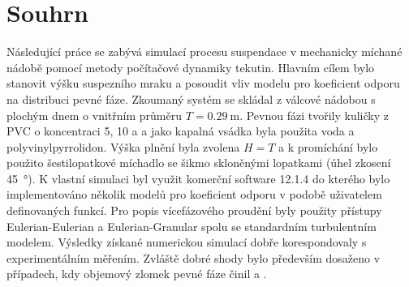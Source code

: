 \section*{Souhrn}
Následující práce se zabývá simulací procesu suspendace v mechanicky míchané nádobě pomocí metody počítačové dynamiky tekutin. Hlavním cílem bylo stanovit výšku suspezního mraku a posoudit vliv modelu pro koeficient odporu na distribuci pevné fáze. Zkoumaný systém se skládal z válcové nádobou s plochým dnem o vnitřním průměru $T=\SI{0.29}{\meter}$. Pevnou fázi tvořily kuličky z PVC o koncentraci 5, 10 a  a jako kapalná vsádka byla použita voda a polyvinylpyrrolidon. Výška plnění byla zvolena $H=T$ a k promíchání bylo použito šestilopatkové míchadlo se šikmo skloněnými lopatkami (úhel zkosení \SI{45}{\degree}). K vlastní simulaci byl využit komerční software \flu{} 12.1.4 do kterého bylo implementováno několik modelů pro koeficient odporu v podobě uživatelem definovaných funkcí. Pro popis vícefázového proudění byly použity přístupy Eulerian-Eulerian a Eulerian-Granular spolu se standardním \keps{} turbulentním modelem. Výsledky získané numerickou simulací dobře korespondovaly s experimentálním měřením. Zvláště dobré shody bylo především dosaženo v případech, kdy objemový zlomek pevné fáze činil  a .
